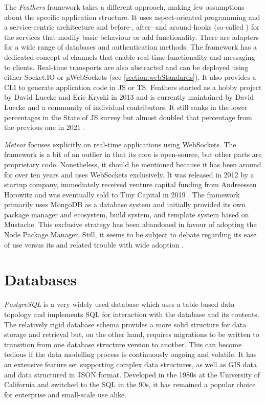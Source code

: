 The \emph{Feathers} framework takes a different approach, making few assumptions about the specific application structure. It uses aspect-oriented programming and a service-centric architecture and before-, after- and around-hooks (so-called ) for the services that modify basic behaviour or add functionality. There are adapters for a wide range of databases and authentication methods. The framework has a dedicated concept of channels that enable real-time functionality and messaging to clients. Real-time transports are also abstracted and can be deployed using either Socket.IO or µWebSockets (see \autoref{section:webStandards}). It also provides a \ac{CLI} to generate application code in \ac{JS} or \ac{TS}. Feathers started as a hobby project by David Luecke and Eric Kryski in 2013 \parencite{feathersFrameworkHistory} and is currently maintained by David Luecke and a community of individual contributors. It still ranks in the lower percentages in the State of JS survey but almost doubled that percentage from the previous one in 2021 \parencite{mostUsedBackendFrameworks21}.

\emph{Meteor} focuses explicitly on real-time applications using WebSockets. The framework is a bit of an outlier in that its core is open-source, but other parts are proprietary code. Nonetheless, it should be mentioned because it has been around for over ten years and uses WebSockets exclusively. It was released in 2012 by a startup company, immediately received venture capital funding from Andreessen Horowitz and was eventually sold to Tiny Capital in 2019 \parencite{meteorSaleTinyCapital}. The framework primarily uses MongoDB as a database system and initially provided its own package manager and ecosystem, build system, and template system based on Mustache. This exclusive strategy has been abandoned in favour of adopting the Node Package Manager. Still, it seems to be subject to debate regarding its ease of use versus its  and related trouble with wide adoption \parencite{meteorDiscussionYCombinator}.


\section{Databases}





\emph{PostgreSQL} is a very widely used database which uses a table-based data topology and implements \ac{SQL} for interaction with the database and its contents. The relatively rigid database schema provides a more solid structure for data storage and retrieval but, on the other hand, requires migrations to be written to transition from one database structure version to another. This can become tedious if the data modelling process is continuously ongoing and volatile. It has an extensive feature set supporting complex data structures, as well as \ac{GIS} data and data structured in \ac{JSON} format. Developed in the 1980s at the University of California and switched to the \ac{SQL} in the 90s, it has remained a popular choice for enterprise and small-scale use alike.

